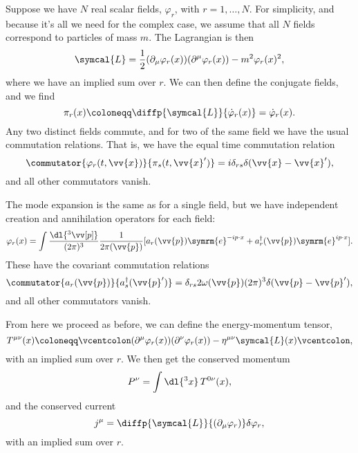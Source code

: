 \documentclass[fleqn]{NotesClass}
\newcommand{\minkowskiMetric}{\eta}
\newcommand{\e}{\symrm{e}}
\newcommand{\lagrangianDensity}{\symcal{L}}
\newcommand{\hermit}{{\dagger}}
\newcommand{\normalordering}[1]{\mathopen{\vcentcolon}{#1}\mathclose{\vcentcolon}}
\begin{document}
    Suppose we have \(N\) real scalar fields, \(\varphi_r\), with \(r = 1, \dotsc, N\).
    For simplicity, and because it's all we need for the complex case, we assume that all \(N\) fields correspond to particles of mass \(m\).
    The Lagrangian is then
    \begin{equation}
        \lagrangianDensity = \frac{1}{2}(\partial_\mu \varphi_r(x))(\partial^\mu \varphi_r(x)) - m^2\varphi_r(x)^2,
    \end{equation}
    where we have an implied sum over \(r\).
    We can then define the conjugate fields, and we find
    \begin{equation}
        \pi_r(x) \coloneqq \diffp{\lagrangianDensity}{\dot{\varphi}_r(x)} = \dot{\varphi}_r(x).
    \end{equation}
    Any two distinct fields commute, and for two of the same field we have the usual commutation relations.
    That is, we have the equal time commutation relation
    \begin{equation}
        \commutator{\varphi_r(t, \vv{x})}{\pi_s(t, \vv{x}')} = i\delta_{rs} \delta(\vv{x} - \vv{x}'),
    \end{equation}
    and all other commutators vanish.
    
    The mode expansion is the same as for a single field, but we have independent creation and annihilation operators for each field:
    \begin{equation}
        \varphi_r(x) = \int \frac{\dl{^3\vv[p]}}{(2\pi)^3} \frac{1}{2\pi(\vv{p})} [a_r(\vv{p})\e^{-ip\cdot x} + a_r^\hermit(\vv{p})\e^{ip\cdot x}].
    \end{equation}
    These have the covariant commutation relations
    \begin{equation}
        \commutator{a_r(\vv{p})}{a_s^\hermit(\vv{p}')} = \delta_{rs} 2\omega(\vv{p}) (2\pi)^3\delta(\vv{p} - \vv{p}'),
    \end{equation}
    and all other commutators vanish.
    
    From here we proceed as before, we can define the energy-momentum tensor,
    \begin{equation}
        T^{\mu\nu}(x) \coloneqq \normalordering{(\partial^\mu \varphi_r(x))(\partial^\nu \varphi_r(x)) - \minkowskiMetric^{\mu\nu}\lagrangianDensity(x)},
    \end{equation}
    with an implied sum over \(r\).
    We then get the conserved momentum
    \begin{equation}
        P^\nu = \int \dl{^3x} \, T^{0\nu}(x),
    \end{equation}
    and the conserved current
    \begin{equation}
        j^\mu = \diffp{\lagrangianDensity}{(\partial_\mu \varphi_r)}\delta \varphi_r,
    \end{equation}
    with an implied sum over \(r\).
    
\end{document}
